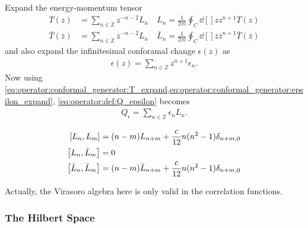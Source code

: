 \documentclass[10pt]{article}
\newcommand{\ii}{\mathrm{i}}
\newenvironment{boxmath}[1]{\begin{tcolorbox}[enhanced,attach boxed title to top center={yshift=-\tcboxedtitleheight/2},boxrule=1pt,title={\centering #1},colframe=NavyBlue!70!black,colback=NavyBlue!10,colbacktitle=NavyBlue!10,fonttitle=\scshape,coltitle=Black]}{\end{tcolorbox}}
\begin{document}
Expand the energy-momentum tensor
\begin{subequations}
    \begin{align}
        T(z)             & =\sum_{n\in\mathbb{Z}}z^{-n-2}L_n\quad L_n=\frac{1}{2\pi\ii}\oint_C\dd[]{z}z^{n+1}T(z)\label{eq:operator:conformal_generator:T_expand} \\
        \bar{T}(\bar{z}) & =\sum_{n\in\mathbb{Z}}\bar{z}^{-n-2}L_n\quad \bar{L}_n=\frac{1}{2\pi\ii}\oint_C\dd[]{\bar{z}}\bar{z}^{n+1}\bar{T}(\bar{z})
    \end{align}
\end{subequations}
and also expand the infinitesimal conforamal change $\epsilon(z)$ as
\begin{align}
    \epsilon(z)=\sum_{n\in\mathbb{Z}}z^{n+1}\epsilon_n.\label{eq:operator:conformal_generator:epsilon_expand}
\end{align}
Now using \cref{eq:operator:conformal_generator:T_expand,eq:operator:conformal_generator:epsilon_expand}, \cref{eq:operator:def:Q_epsilon} becomes
\begin{align}
    Q_{\epsilon}=\sum_{n\in\mathbb{Z}}\epsilon_n L_n.
\end{align}
\begin{boxmath}{Virasoro Algebra}
    \begin{subequations}
        \begin{align}
            \comm{L_n}{L_m}             & =(n-m)L_{n+m}+\frac{c}{12}n(n^2-1)\delta_{n+m,0}\label{eq:operator:virasoro_1} \\
            \comm{L_n}{\bar{L}_m}       & =0                                                                             \\
            \comm{\bar{L}_n}{\bar{L}_m} & =(n-m)\bar{L}_{n+m}+\frac{c}{12}n(n^2-1)\delta_{n+m,0}
        \end{align}
    \end{subequations}
\end{boxmath}
\begin{remark}
    Actually, the Virasoro algebra here is only valid in the correlation functions.
\end{remark}

\subsubsection{The Hilbert Space}
\end{document}
